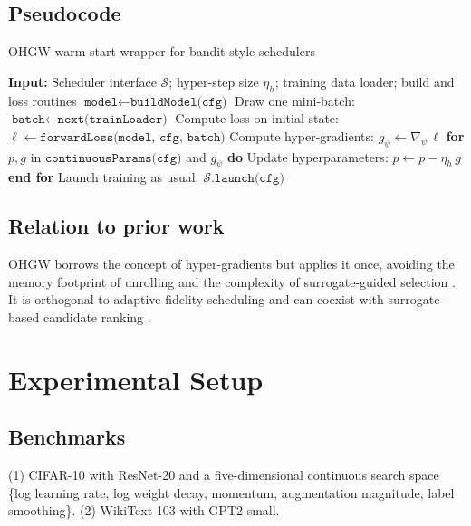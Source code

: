\documentclass{article} %
\begin{document}
\subsection{Pseudocode}
\begin{algorithm}
\caption{OHGW warm-start wrapper for bandit-style schedulers}
\begin{algorithmic}
  \State \textbf{Input:} Scheduler interface \(\mathcal{S}\); hyper-step size \(\eta_h\); training data loader; build and loss routines
    \State \(\texttt{model} \leftarrow \texttt{buildModel(cfg)}\)
    \State Draw one mini-batch: \(\texttt{batch} \leftarrow \texttt{next(trainLoader)}\)
    \State Compute loss on initial state: \(\ell \leftarrow \texttt{forwardLoss(model, cfg, batch)}\)
    \State Compute hyper-gradients: \(g_{\psi} \leftarrow \nabla_{\psi} \, \ell\)
    \State \textbf{for} \(p, g\) in \(\texttt{continuousParams(cfg)}\) and \(g_{\psi}\) \textbf{do}
      \State \hspace{1em} Update hyperparameters: \(p \leftarrow p - \eta_h \, g\)
    \State \textbf{end for}
    \State Launch training as usual: \(\mathcal{S}.\texttt{launch(cfg)}\)
  \EndFor
\end{algorithmic}
\end{algorithm}

\subsection{Relation to prior work}
OHGW borrows the concept of hyper-gradients but applies it once, avoiding the memory footprint of unrolling \cite{bertrand-2020-implicit} and the complexity of surrogate-guided selection \cite{nguyen-2019-bayesian}. It is orthogonal to adaptive-fidelity scheduling \cite{jiang-2024-efficient} and can coexist with surrogate-based candidate ranking \cite{khazi-2023-deep}.

\section{Experimental Setup}
\label{sec:experimental}
\subsection{Benchmarks}
(1) CIFAR-10 with ResNet-20 and a five-dimensional continuous search space \{log learning rate, log weight decay, momentum, augmentation magnitude, label smoothing\}. (2) WikiText-103 with GPT2-small.
\end{document}
